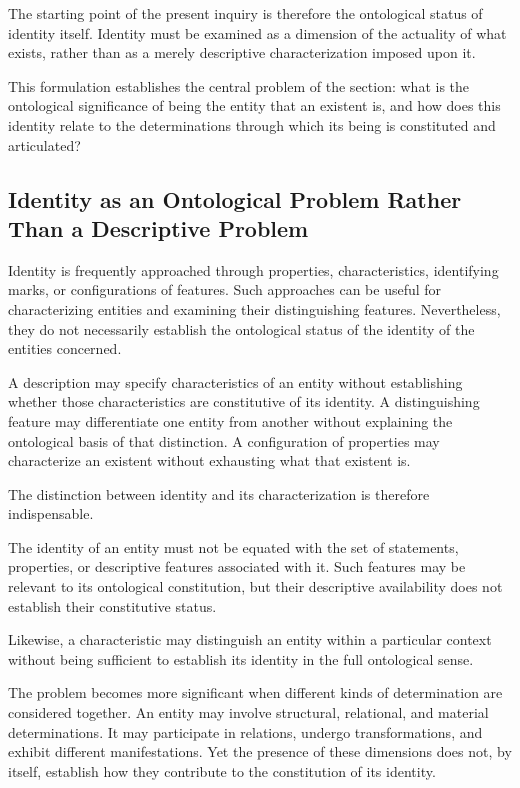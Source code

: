 The starting point of the present inquiry is
therefore the ontological status of identity itself.
Identity must be examined as a dimension of the
actuality of what exists, rather than as a merely
descriptive characterization imposed upon it.

This formulation establishes the central problem
of the section: what is the ontological significance
of being the entity that an existent is, and how
does this identity relate to the determinations
through which its being is constituted and articulated?



\subsection{Identity as an Ontological Problem Rather Than a Descriptive Problem}

Identity is frequently approached through properties,
characteristics, identifying marks, or configurations
of features. Such approaches can be useful for
characterizing entities and examining their
distinguishing features. Nevertheless, they do
not necessarily establish the ontological status
of the identity of the entities concerned.

A description may specify characteristics of
an entity without establishing whether those
characteristics are constitutive of its identity.
A distinguishing feature may differentiate one
entity from another without explaining the
ontological basis of that distinction. A
configuration of properties may characterize
an existent without exhausting what that
existent is.

The distinction between identity and its
characterization is therefore indispensable.

The identity of an entity must not be equated
with the set of statements, properties, or
descriptive features associated with it.
Such features may be relevant to its ontological
constitution, but their descriptive availability
does not establish their constitutive status.

Likewise, a characteristic may distinguish
an entity within a particular context without
being sufficient to establish its identity
in the full ontological sense.

The problem becomes more significant when
different kinds of determination are considered
together. An entity may involve structural,
relational, and material determinations. It may
participate in relations, undergo transformations,
and exhibit different manifestations. Yet the
presence of these dimensions does not, by itself,
establish how they contribute to the constitution
of its identity.

